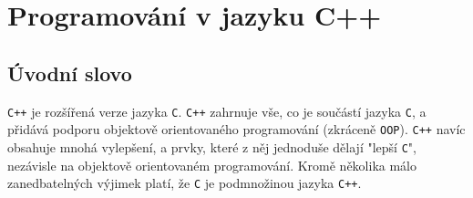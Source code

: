 \chapter{Programování v jazyku C++}
\minitoc

  \section{Úvodní slovo}
    \texttt{C++} je rozšířená verze jazyka \texttt{C}. \texttt{C++} zahrnuje vše, co je součástí 
    jazyka \texttt{C}, a přidává podporu objektově orientovaného programování (zkráceně 
    \texttt{OOP}). \texttt{C++} navíc obsahuje mnohá vylepšení, a prvky, které z něj jednoduše 
    dělají "lepší \texttt{C}", nezávisle na objektově orientovaném programování. Kromě několika 
    málo zanedbatelných výjimek platí, že \texttt{C} je podmnožinou jazyka \texttt{C++}.
  
